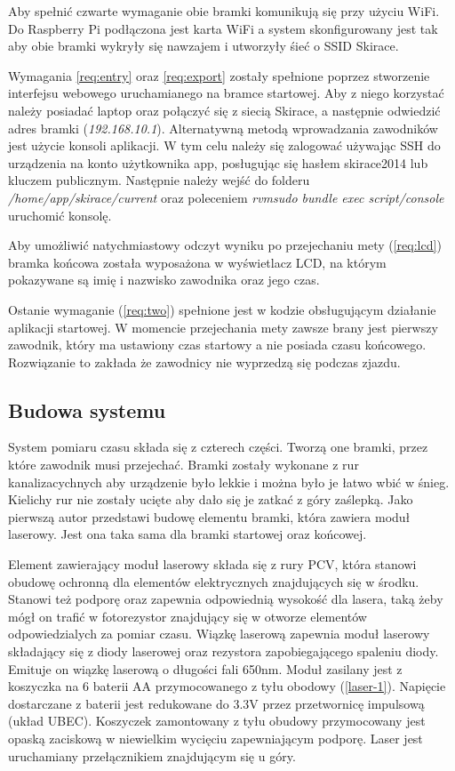 \documentclass[11pt,a4paper, twoside]{article}
\begin{document}
Aby spełnić czwarte wymaganie obie bramki komunikują się przy użyciu WiFi. Do Raspberry Pi podłączona jest karta WiFi a system skonfigurowany jest tak aby obie bramki wykryły się nawzajem i utworzyły śieć o SSID Skirace.

Wymagania \ref{req:entry} oraz \ref{req:export} zostały spełnione poprzez stworzenie interfejsu webowego uruchamianego na bramce startowej. Aby z niego korzystać należy posiadać laptop oraz połączyć się z siecią Skirace, a następnie odwiedzić adres bramki (\emph{192.168.10.1}). Alternatywną metodą wprowadzania zawodników jest użycie konsoli aplikacji. W tym celu należy się zalogować używając SSH do urządzenia na konto użytkownika app, posługując się hasłem skirace2014 lub kluczem publicznym. Następnie należy wejść do folderu \emph{/home/app/skirace/current} oraz poleceniem \emph{rvmsudo bundle exec script/console} uruchomić konsolę. 

Aby umożliwić natychmiastowy odczyt wyniku po przejechaniu mety (\ref{req:lcd}) bramka końcowa została wyposażona w wyświetlacz LCD, na którym pokazywane są imię i nazwisko zawodnika oraz jego czas. 

Ostanie wymaganie (\ref{req:two}) spełnione jest w kodzie obsługującym działanie aplikacji startowej. W momencie przejechania mety zawsze brany jest pierwszy zawodnik, który ma ustawiony czas startowy a nie posiada czasu końcowego. Rozwiązanie to zakłada że zawodnicy nie wyprzedzą się podczas zjazdu.
\subsection{Budowa systemu}
System pomiaru czasu składa się z czterech części. Tworzą one bramki, przez które zawodnik musi przejechać. Bramki zostały wykonane z rur kanalizacychnych aby urządzenie było lekkie i można było je łatwo wbić w śnieg. Kielichy rur nie zostały ucięte aby dało się je zatkać z góry zaślepką. Jako pierwszą autor przedstawi budowę elementu bramki, która zawiera moduł laserowy. Jest ona taka sama dla bramki startowej oraz końcowej.

Element zawierający moduł laserowy składa się z rury PCV, która stanowi obudowę ochronną dla elementów elektrycznych znajdujących się w środku. Stanowi też podporę oraz zapewnia odpowiednią wysokość dla lasera, taką żeby mógł on trafić w fotorezystor znajdujący się w otworze elementów odpowiedzialych za pomiar czasu. Wiązkę laserową zapewnia moduł laserowy składający się z diody laserowej oraz rezystora zapobiegającego spaleniu diody. Emituje on wiązkę laserową o długości fali 650nm. Moduł zasilany jest z koszyczka na 6 baterii AA przymocowanego z tyłu obodowy (\ref{laser-1}). Napięcie dostarczane z baterii jest redukowane do 3.3V przez przetwornicę impulsową (układ UBEC). Koszyczek zamontowany z tyłu obudowy przymocowany jest opaską zaciskową w niewielkim wycięciu zapewniającym podporę. Laser jest uruchamiany przełącznikiem znajdującym się u góry. 
\end{document}
